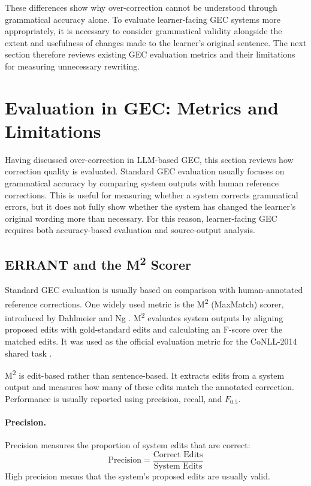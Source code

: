 These differences show why over-correction cannot be understood through grammatical accuracy alone. To evaluate learner-facing GEC systems more appropriately, it is necessary to consider grammatical validity alongside the extent and usefulness of changes made to the learner's original sentence. The next section therefore reviews existing GEC evaluation metrics and their limitations for measuring unnecessary rewriting.

\section{Evaluation in GEC: Metrics and Limitations}

Having discussed over-correction in LLM-based GEC, this section reviews how correction quality is evaluated. Standard GEC evaluation usually focuses on grammatical accuracy by comparing system outputs with human reference corrections. This is useful for measuring whether a system corrects grammatical errors, but it does not fully show whether the system has changed the learner's original wording more than necessary. For this reason, learner-facing GEC requires both accuracy-based evaluation and source-output analysis.

\subsection{ERRANT and the M\textsuperscript{2} Scorer}

Standard GEC evaluation is usually based on comparison with human-annotated reference corrections. One widely used metric is the M\textsuperscript{2} (MaxMatch) scorer, introduced by Dahlmeier and Ng \cite{dahlmeier-ng-2012-better}. M\textsuperscript{2} evaluates system outputs by aligning proposed edits with gold-standard edits and calculating an F-score over the matched edits. It was used as the official evaluation metric for the CoNLL-2014 shared task \cite{ng-etal-2014-conll}.

M\textsuperscript{2} is edit-based rather than sentence-based. It extracts edits from a system output and measures how many of these edits match the annotated correction. Performance is usually reported using precision, recall, and $F_{0.5}$.

\paragraph{Precision.}
Precision measures the proportion of system edits that are correct:
\[
\text{Precision} = \frac{\text{Correct Edits}}{\text{System Edits}}
\]
High precision means that the system's proposed edits are usually valid.

